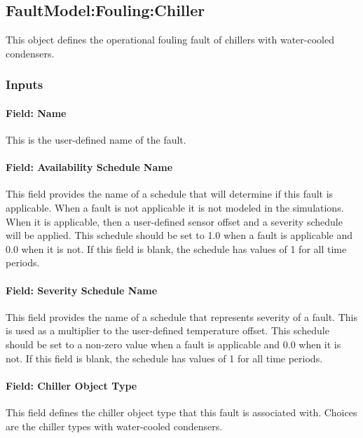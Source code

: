 \subsection{FaultModel:Fouling:Chiller}\label{faultmodelfoulingchiller}

This object defines the operational fouling fault of chillers with water-cooled condensers.

\subsubsection{Inputs}

\paragraph{Field: Name}

This is the user-defined name of the fault.

\paragraph{Field: Availability Schedule Name}

This field provides the name of a schedule that will determine if this fault is applicable. When a fault is not applicable it is not modeled in the simulations. When it is applicable, then a user-defined sensor offset and a severity schedule will be applied. This schedule should be set to 1.0 when a fault is applicable and 0.0 when it is not. If this field is blank, the schedule has values of 1 for all time periods.

\paragraph{Field: Severity Schedule Name}\label{field-severity-schedule-name}

This field provides the name of a schedule that represents severity of a fault. This is used as a multiplier to the user-defined temperature offset. This schedule should be set to a non-zero value when a fault is applicable and 0.0 when it is not. If this field is blank, the schedule has values of 1 for all time periods.

\paragraph{Field: Chiller Object Type}\label{field-chiller-object-type}

This field defines the chiller object type that this fault is associated with. Choices are the chiller types with water-cooled condensers. 

